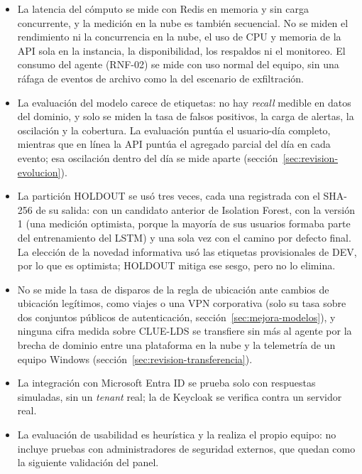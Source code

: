 \begin{itemize}
	\item La latencia del cómputo se mide con Redis en memoria y sin carga concurrente, y la medición en la nube es también secuencial. No se miden el rendimiento ni la concurrencia en la nube, el uso de CPU y memoria de la API sola en la instancia, la disponibilidad, los respaldos ni el monitoreo. El consumo del agente (RNF-02) se mide con uso normal del equipo, sin una ráfaga de eventos de archivo como la del escenario de exfiltración.
	\item La evaluación del modelo carece de etiquetas: no hay \emph{recall} medible en datos del dominio, y solo se miden la tasa de falsos positivos, la carga de alertas, la oscilación y la cobertura. La evaluación puntúa el usuario-día completo, mientras que en línea la API puntúa el agregado parcial del día en cada evento; esa oscilación dentro del día se mide aparte (sección~\ref{sec:revision-evolucion}).
	\item La partición HOLDOUT se usó tres veces, cada una registrada con el SHA-256 de su salida: con un candidato anterior de Isolation Forest, con la versión 1 (una medición optimista, porque la mayoría de sus usuarios formaba parte del entrenamiento del LSTM) y una sola vez con el camino por defecto final. La elección de la novedad informativa usó las etiquetas provisionales de DEV, por lo que es optimista; HOLDOUT mitiga ese sesgo, pero no lo elimina.
	\item No se mide la tasa de disparos de la regla de ubicación ante cambios de ubicación legítimos, como viajes o una VPN corporativa (solo su tasa sobre dos conjuntos públicos de autenticación, sección~\ref{sec:mejora-modelos}), y ninguna cifra medida sobre CLUE-LDS se transfiere sin más al agente por la brecha de dominio entre una plataforma en la nube y la telemetría de un equipo Windows (sección~\ref{sec:revision-transferencia}).
	\item La integración con Microsoft Entra ID se prueba solo con respuestas simuladas, sin un \emph{tenant} real; la de Keycloak se verifica contra un servidor real.
	\item La evaluación de usabilidad es heurística y la realiza el propio equipo: no incluye pruebas con administradores de seguridad externos, que quedan como la siguiente validación del panel.
\end{itemize}

